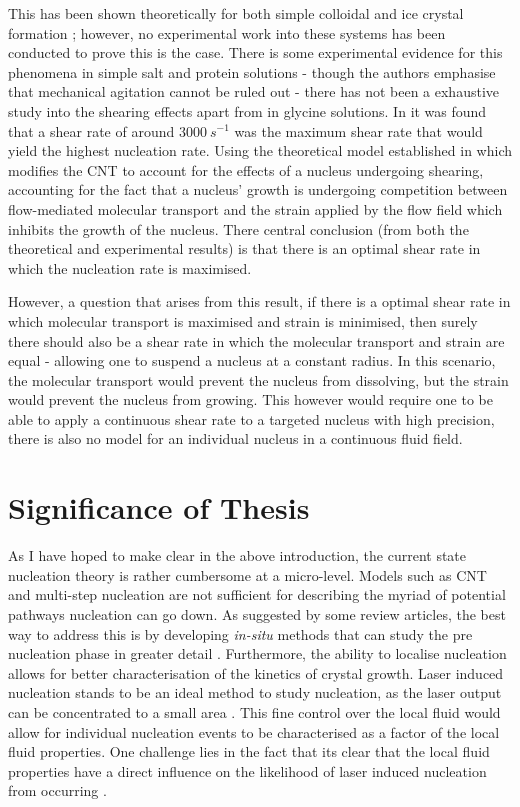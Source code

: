 This has been shown theoretically for both simple colloidal \cite{Mura2016,
Debuysschere2023,Richard2015} and ice crystal formation \cite{Goswami2020}; however, no experimental work into these systems has been conducted to prove 
this is the case. There is some experimental evidence for this phenomena in 
simple salt and protein solutions - though the authors emphasise that mechanical agitation cannot be ruled out - there has not been a exhaustive study into the shearing effects apart from in glycine solutions. In \cite{Debuysschere2023} it was found that a shear rate of around $3000\ s^{-1}$ was the maximum shear rate that would yield the highest nucleation rate. Using the theoretical model established in \cite{Mura2016,2001} which modifies the CNT to account for the effects of a nucleus undergoing shearing, 
accounting for the fact that a nucleus' growth is undergoing competition 
between flow-mediated molecular transport and the strain applied by the 
flow field which inhibits the growth of the nucleus. There central 
conclusion (from both the theoretical and experimental results) is that 
there is an optimal shear rate in which the nucleation rate is maximised. 

However, a question that arises from this result, if there is a optimal 
shear rate in which molecular transport is maximised and strain is 
minimised, then surely there should also be a shear rate in which the 
molecular transport and strain are equal - allowing one to suspend a 
nucleus at a constant radius. In this scenario, the molecular transport 
would prevent the nucleus from dissolving, but the strain would prevent 
the nucleus from growing. This however would require one to be able 
to apply a continuous shear rate to a targeted nucleus with high precision, there is also no model for an individual nucleus in a continuous fluid 
field. 


\section{Significance of Thesis}
As I have hoped to make clear in the above introduction, the 
current state nucleation theory is rather cumbersome at a 
micro-level. Models such as CNT and multi-step nucleation are 
not sufficient for describing the myriad of potential pathways 
nucleation can go down. As suggested by some review articles, 
the best way to address this is by developing \textit{in-situ} 
methods that can study the pre nucleation phase in greater detail \cite{Fu2021}. Furthermore, the ability to localise nucleation 
allows for better characterisation of the kinetics of crystal 
growth. Laser induced nucleation stands to be an ideal method to 
study nucleation, as the laser output can be concentrated to a 
small area \cite{Korede2023}. This fine control over the local 
fluid would allow for individual nucleation events to be
characterised as a factor of the local fluid properties. One 
challenge lies in the fact that its clear that the local fluid 
properties have a direct influence on the likelihood of laser
induced nucleation from occurring \cite{Korede2023, Ward2016,
Yuyama2012, Liao2022}. 

